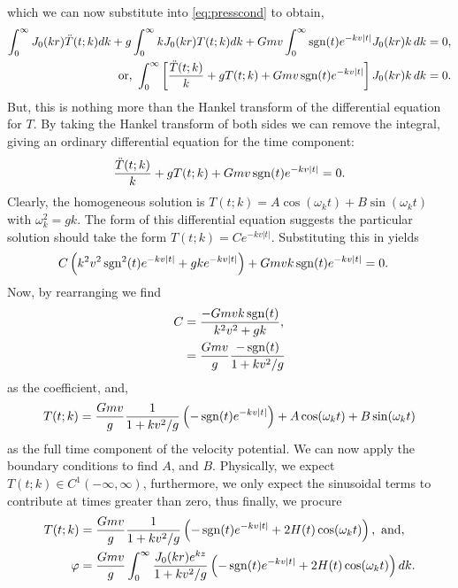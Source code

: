 which we can now substitute into \eqref{eq:presscond} to obtain,
\begin{align*}
\int_0^\infty J_0(kr)  \ddot{T}(t;k) dk + g \int_0^\infty k J_0(kr) T(t;k) dk + Gmv \int_0^\infty \operatorname{sgn}(t) e^{-kv|t|} J_0(kr)k \, dk &= 0, \\
\text{or, } \int_0^\infty \left[ \frac{\ddot{T}(t;k)}{k} + gT(t;k) + Gmv \operatorname{sgn}(t) e^{-kv|t|} \right] J_0(kr) k \, dk &= 0.
\end{align*}
But, this is nothing more than the Hankel transform of the differential equation for $T$. By taking the Hankel transform of both sides we can remove the integral, giving an ordinary differential equation for the time component:
\begin{align*}
\frac{\ddot{T}(t;k)}{k} + gT(t;k) + Gmv \operatorname{sgn}(t) e^{-kv|t|} = 0.
\end{align*}
Clearly, the homogeneous solution is $T(t;k) = A \cos(\omega_k t) + B \sin(\omega_k t)$ with $\omega_k^2 = gk$. The form of this differential equation suggests the particular solution should take the form $T(t;k) = C e^{-kv|t|}$. Substituting this in yields
\begin{align*}
C \left(k^2 v^2 \operatorname{sgn}^2(t) e^{-kv |t|} + gk e^{-kv |t|} \right) &+ Gmvk \operatorname{sgn}(t) e^{-kv|t|} = 0.
\end{align*}
Now, by rearranging we find
\begin{align*}
C &= \frac{-Gmvk \operatorname{sgn}(t)}{k^2v^2 + gk}, \\
&= \frac{Gmv}{g} \frac{-\operatorname{sgn}(t)}{1+kv^2/g}
\end{align*}
as the coefficient, and,
\begin{align*}
T(t;k) = \frac{Gmv}{g} \frac{1}{1+kv^2/g} \left( -\operatorname{sgn}(t) e^{-kv|t|} \right) + A \cos(\omega_k t) + B \sin(\omega_k t)
\end{align*}
as the full time component of the velocity potential. We can now apply the boundary conditions to find $A$, and $B$. Physically, we expect $T(t;k) \in C^1(-\infty,\infty)$, furthermore, we only expect the sinusoidal terms to contribute at times greater than zero, thus finally, we procure
\begin{align*}
T(t;k) &= \frac{Gmv}{g}\frac{1}{1+kv^2/g} \left(-\operatorname{sgn}(t)e^{-kv|t|} + 2H(t)\cos(\omega_k t) \right), \text{ and,} \\
\varphi &= \frac{Gmv}{g} \int_0^\infty \frac{J_0(kr)e^{kz}}{1+kv^2/g} \left(-\operatorname{sgn}(t)e^{-kv|t|} + 2H(t)\cos(\omega_k t) \right) dk.
\end{align*}

